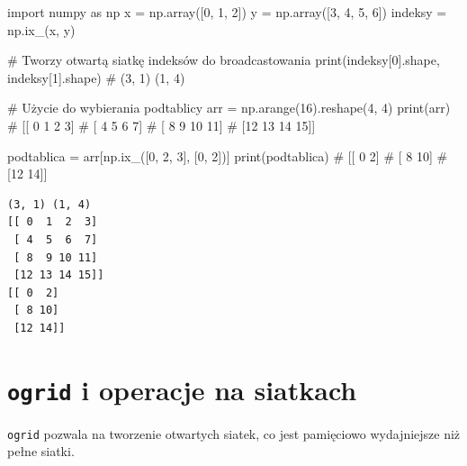 \documentclass[
  polish,
  letterpaper,
  DIV=11,
  numbers=noendperiod]{scrreprt}
\newenvironment{Shaded}{\begin{snugshade}}{\end{snugshade}}
\newcommand{\BuiltInTok}[1]{\textcolor[rgb]{0.00,0.23,0.31}{#1}}
\newcommand{\CommentTok}[1]{\textcolor[rgb]{0.37,0.37,0.37}{#1}}
\newcommand{\DecValTok}[1]{\textcolor[rgb]{0.68,0.00,0.00}{#1}}
\newcommand{\ImportTok}[1]{\textcolor[rgb]{0.00,0.46,0.62}{#1}}
\newcommand{\NormalTok}[1]{\textcolor[rgb]{0.00,0.23,0.31}{#1}}
\newcommand{\OperatorTok}[1]{\textcolor[rgb]{0.37,0.37,0.37}{#1}}
\begin{document}
\begin{Shaded}
\begin{Highlighting}[]
\ImportTok{import}\NormalTok{ numpy }\ImportTok{as}\NormalTok{ np}
\NormalTok{x }\OperatorTok{=}\NormalTok{ np.array([}\DecValTok{0}\NormalTok{, }\DecValTok{1}\NormalTok{, }\DecValTok{2}\NormalTok{])}
\NormalTok{y }\OperatorTok{=}\NormalTok{ np.array([}\DecValTok{3}\NormalTok{, }\DecValTok{4}\NormalTok{, }\DecValTok{5}\NormalTok{, }\DecValTok{6}\NormalTok{])}
\NormalTok{indeksy }\OperatorTok{=}\NormalTok{ np.ix\_(x, y)}

\CommentTok{\# Tworzy otwartą siatkę indeksów do broadcastowania}
\BuiltInTok{print}\NormalTok{(indeksy[}\DecValTok{0}\NormalTok{].shape, indeksy[}\DecValTok{1}\NormalTok{].shape)  }\CommentTok{\# (3, 1) (1, 4)}

\CommentTok{\# Użycie do wybierania podtablicy}
\NormalTok{arr }\OperatorTok{=}\NormalTok{ np.arange(}\DecValTok{16}\NormalTok{).reshape(}\DecValTok{4}\NormalTok{, }\DecValTok{4}\NormalTok{)}
\BuiltInTok{print}\NormalTok{(arr)}
\CommentTok{\# [[ 0  1  2  3]}
\CommentTok{\#  [ 4  5  6  7]}
\CommentTok{\#  [ 8  9 10 11]}
\CommentTok{\#  [12 13 14 15]]}

\NormalTok{podtablica }\OperatorTok{=}\NormalTok{ arr[np.ix\_([}\DecValTok{0}\NormalTok{, }\DecValTok{2}\NormalTok{, }\DecValTok{3}\NormalTok{], [}\DecValTok{0}\NormalTok{, }\DecValTok{2}\NormalTok{])]}
\BuiltInTok{print}\NormalTok{(podtablica)}
\CommentTok{\# [[ 0  2]}
\CommentTok{\#  [ 8 10]}
\CommentTok{\#  [12 14]]}
\end{Highlighting}
\end{Shaded}

\begin{verbatim}
(3, 1) (1, 4)
[[ 0  1  2  3]
 [ 4  5  6  7]
 [ 8  9 10 11]
 [12 13 14 15]]
[[ 0  2]
 [ 8 10]
 [12 14]]
\end{verbatim}

\section{\texorpdfstring{\texttt{ogrid} i operacje na
siatkach}{ogrid i operacje na siatkach}}\label{ogrid-i-operacje-na-siatkach}

\texttt{ogrid} pozwala na tworzenie otwartych siatek, co jest pamięciowo
wydajniejsze niż pełne siatki.
\end{document}

